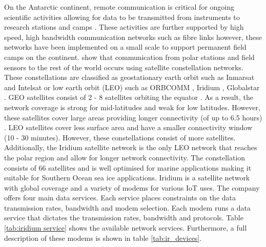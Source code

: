 On the Antarctic continent, remote communication is critical for ongoing scientific activities allowing for data to be transmitted from instruments to research stations and camps \cite{Sanghyun2016satellite}. These activities are further supported by high speed, high bandwidth communication networks such as fibre links \cite{jabbar2001multi} however, these networks have been implemented on a small scale to support permanent field camps \cite{Sanghyun2016satellite} on the continent. \textcite{Sanghyun2016satellite} show that communication from polar stations and field sensors to the rest of the world occurs using satellite constellation networks. These constellations are classified as  geostationary earth orbit such as Inmarsat \cite{inmarsat2021website} and Intelsat \cite{intelsat2021website} or low earth orbit (LEO) such as ORBCOMM \cite{orbcomm2021website}, Iridium \cite{iridium2019website}, Globalstar \cite{globalstar2021website} \cite{jabbar2001multi}. GEO satellites consist of 2 - 8 satellites orbiting the equator \cite{jabbar2001multi}. As a result, the network coverage is strong for mid-latitudes and weak for low latitudes. However, these satellites cover large areas providing longer connectivity (of up to 6.5 hours) \cite{Sanghyun2016satellite}. LEO satellites cover less surface area and have a smaller connectivity window (10 - 30 minutes). However, these constellations consist of more satellites. Additionally, the Iridium satellite network is the only LEO network that reaches the polar region \cite{jabbar2001multi} and allow for longer network connectivity. The constellation consists of 66 satellites \cite{Sanghyun2016satellite} and is well optimised for marine applications making it suitable for Southern Ocean sea ice applications. Iridium is a satellite network with global coverage and a variety of modems for various IoT uses. The company offers four main data services. Each service places constraints on the data transmission rates, bandwidth and modem selection. Each modem runs a data service that dictates the transmission rates, bandwidth and protocols.  Table \ref{tab:iridium service} shows the available network services. Furthermore, a full description of these modems is shown in table \ref{tab:ir_devices}. \par 


